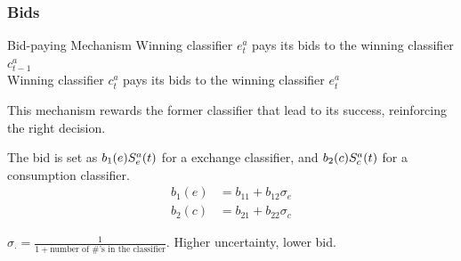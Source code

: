 \begin{frame}
    \frametitle{Bids}
    \begin{block}{Bid-paying Mechanism}
        Winning classifier $e^a_t$ pays its bids to the winning classifier $c^a_{t-1}$\\
        Winning classifier $c^a_t$ pays its bids to the winning classifier $e^a_t$
    \end{block}

    This mechanism rewards the former classifier that lead to its success, reinforcing the right decision.

    \pause
    The bid is set as $b_1(e)S^a_e(t)$ for a exchange classifier, 
    and $b_2(c)S^a_c(t)$ for a consumption classifier.
    \begin{subequations}
        \begin{align}
            b_1(e) &= b_{11} + b_{12} \sigma_e \\
            b_2(c) &= b_{21} + b_{22} \sigma_c
        \end{align}
    \end{subequations}

    $\sigma_\cdot = \frac{1}{1+\text{number of \#'s in the classifier}}$. Higher uncertainty, lower bid.

\end{frame}

